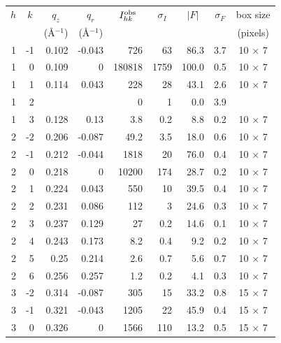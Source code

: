 \begin{table}[htbp]
  \centering
  \begin{tabular}{rrrrrrrrc}
    \hline
    \multicolumn{1}{c}{$h$} & \multicolumn{1}{c}{$k$} & \multicolumn{1}{c}{$q_z$} & 
    \multicolumn{1}{c}{$q_r$} & \multicolumn{1}{c}{$I_{hk}^\textrm{obs}$} & 
    \multicolumn{1}{c}{$\sigma_I$} & \multicolumn{1}{c}{$|F|$} &
    \multicolumn{1}{c}{$\sigma_F$} & \multicolumn{1}{c}{box size} \\
     & & \multicolumn{1}{c}{(\AA$^{-1}$)} & \multicolumn{1}{c}{(\AA$^{-1}$)} & & & & &
    \multicolumn{1}{c}{(pixels)} \\ 
    \hline
1     & -1    & 0.102 & -0.043 & 726   & 63    & 86.3  & 3.7   & 10 $\times$ 7 \\
1     & 0     & 0.109 & 0     & 180818 & 1759  & 100.0 & 0.5   & 10 $\times$ 7 \\
1     & 1     & 0.114 & 0.043 & 228   & 28    & 43.1  & 2.6   & 10 $\times$ 7 \\
1     & 2     &       &       & 0     & 1     & 0.0   & 3.9   &  \\
1     & 3     & 0.128 & 0.13  & 3.8   & 0.2   & 8.8   & 0.2   & 10 $\times$ 7 \\
2     & -2    & 0.206 & -0.087 & 49.2  & 3.5   & 18.0  & 0.6   & 10 $\times$ 7 \\
2     & -1    & 0.212 & -0.044 & 1818  & 20    & 76.0  & 0.4   & 10 $\times$ 7 \\
2     & 0     & 0.218 & 0     & 10200 & 174   & 28.7  & 0.2   & 10 $\times$ 7 \\
2     & 1     & 0.224 & 0.043 & 550   & 10    & 39.5  & 0.4   & 10 $\times$ 7 \\
2     & 2     & 0.231 & 0.086 & 112   & 3     & 24.6  & 0.3   & 10 $\times$ 7 \\
2     & 3     & 0.237 & 0.129 & 27    & 0.2   & 14.6  & 0.1   & 10 $\times$ 7 \\
2     & 4     & 0.243 & 0.173 & 8.2   & 0.4   & 9.2   & 0.2   & 10 $\times$ 7 \\
2     & 5     & 0.25  & 0.214 & 2.6   & 0.7   & 5.6   & 0.7   & 10 $\times$ 7 \\
2     & 6     & 0.256 & 0.257 & 1.2   & 0.2   & 4.1   & 0.3   & 10 $\times$ 7 \\
3     & -2    & 0.314 & -0.087 & 305   & 15    & 33.2  & 0.8   & 15 $\times$ 7 \\
3     & -1    & 0.321 & -0.043 & 1205  & 22    & 45.9  & 0.4   & 15 $\times$ 7 \\
3     & 0     & 0.326 & 0     & 1566  & 110   & 13.2  & 0.5   & 15 $\times$ 7 \\

\end{tabular}
\end{table}
